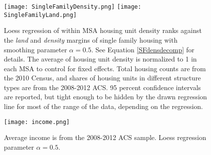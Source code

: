 \documentclass[]{article}
\theoremstyle{plain}
\begin{document}
\begin{center}
	\begin{figure}[htbp!]
		\texttt{[image: SingleFamilyDensity.png]}
		\texttt{[image: SingleFamilyLand.png]}
		\caption{Loess regression of within MSA housing unit density ranks against the \textit{land} and \textit{density} margins of single family housing with smoothing parameter $\alpha = 0.5$. See Equation \eqref{SFdensdecomp} for details. The average of housing unit density is normalized to 1 in each MSA to control for fixed effects. Total housing counts are from the 2010 Census, and shares of housing units in different structure types are from the 2008-2012 ACS. 95 percent confidence intervals are reported, but tight enough to be hidden by the drawn regression line for most of the range of the data, depending on the regression.}
		\label{SFlanddensity}
	\end{figure}
\end{center}


\begin{center}
	\begin{figure}[htbp!]
	\texttt{[image: income.png]}
	\caption{Average income is from the 2008-2012 ACS sample. Loess regression parameter $\alpha = 0.5$.}
	\label{income}
	\end{figure}
\end{center}

%
\end{document}
